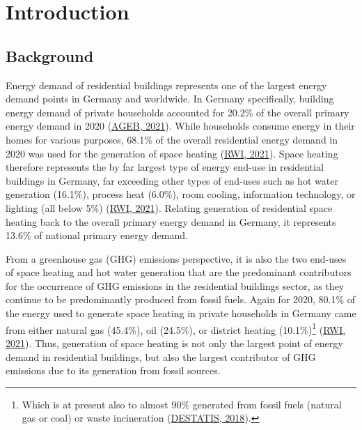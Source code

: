 \documentclass[12pt,twoside]{reedthesis}
\begin{document}
\mainmatter %
\pagestyle{fancyplain} %

\setlength{\parskip}{6pt} %

\hypertarget{introduction}{%
\chapter{Introduction}\label{introduction}}

\hypertarget{background}{%
\section{Background}\label{background}}

Energy demand of residential buildings represents one of the largest energy demand points in Germany and worldwide. In Germany specifically, building energy demand of private households accounted for 20.2\% of the overall primary energy demand in 2020 (\protect\hyperlink{ref-ageb21}{AGEB, 2021}). While households consume energy in their homes for various purposes, 68.1\% of the overall residential energy demand in 2020 was used for the generation of space heating (\protect\hyperlink{ref-rwi21}{RWI, 2021}). Space heating therefore represents the by far largest type of energy end-use in residential buildings in Germany, far exceeding other types of end-uses such as hot water generation (16.1\%), process heat (6.0\%), room cooling, information technology, or lighting (all below 5\%) (\protect\hyperlink{ref-rwi21}{RWI, 2021}). Relating generation of residential space heating back to the overall primary energy demand in Germany, it represents 13.6\% of national primary energy demand.

From a greenhouse gas (GHG) emissions perspective, it is also the two end-uses of space heating and hot water generation that are the predominant contributors for the occurrence of GHG emissions in the residential buildings sector, as they continue to be predominantly produced from fossil fuels. Again for 2020, 80.1\% of the energy used to generate space heating in private households in Germany came from either natural gas (45.4\%), oil (24.5\%), or district heating (10.1\%)\footnote{Which is at present also to almost 90\% generated from fossil fuels (natural gas or coal) or waste incineration (\protect\hyperlink{ref-destatis18}{DESTATIS, 2018}).} (\protect\hyperlink{ref-rwi21}{RWI, 2021}). Thus, generation of space heating is not only the largest point of energy demand in residential buildings, but also the largest contributor of GHG emissions due to its generation from fossil sources.
\end{document}
